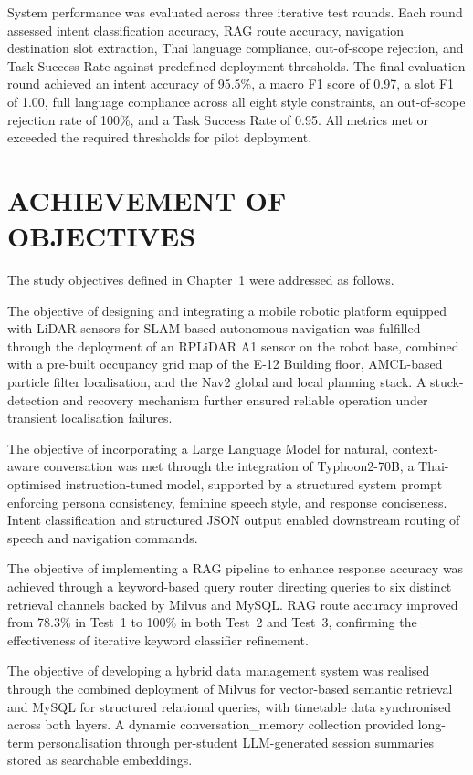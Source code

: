 System performance was evaluated across three iterative test rounds. Each round assessed intent classification accuracy, RAG route accuracy, navigation destination slot extraction, Thai language compliance, out-of-scope rejection, and Task Success Rate against predefined deployment thresholds. The final evaluation round achieved an intent accuracy of 95.5\%, a macro F1 score of 0.97, a slot F1 of 1.00, full language compliance across all eight style constraints, an out-of-scope rejection rate of 100\%, and a Task Success Rate of 0.95. All metrics met or exceeded the required thresholds for pilot deployment.

\section{ACHIEVEMENT OF OBJECTIVES}

The study objectives defined in Chapter~1 were addressed as follows.

The objective of designing and integrating a mobile robotic platform equipped with LiDAR sensors for SLAM-based autonomous navigation was fulfilled through the deployment of an RPLiDAR A1 sensor on the robot base, combined with a pre-built occupancy grid map of the E-12 Building floor, AMCL-based particle filter localisation, and the Nav2 global and local planning stack. A stuck-detection and recovery mechanism further ensured reliable operation under transient localisation failures.

The objective of incorporating a Large Language Model for natural, context-aware conversation was met through the integration of Typhoon2-70B, a Thai-optimised instruction-tuned model, supported by a structured system prompt enforcing persona consistency, feminine speech style, and response conciseness. Intent classification and structured JSON output enabled downstream routing of speech and navigation commands.

The objective of implementing a RAG pipeline to enhance response accuracy was achieved through a keyword-based query router directing queries to six distinct retrieval channels backed by Milvus and MySQL. RAG route accuracy improved from 78.3\% in Test~1 to 100\% in both Test~2 and Test~3, confirming the effectiveness of iterative keyword classifier refinement.

The objective of developing a hybrid data management system was realised through the combined deployment of Milvus for vector-based semantic retrieval and MySQL for structured relational queries, with timetable data synchronised across both layers. A dynamic conversation\_memory collection provided long-term personalisation through per-student LLM-generated session summaries stored as searchable embeddings.

